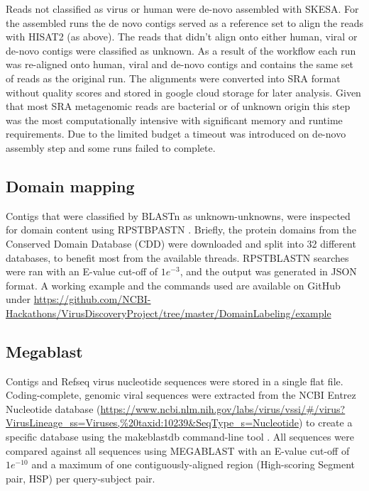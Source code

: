   Reads not classified as virus or human were de-novo assembled with SKESA. For
  the assembled runs the de novo contigs served as a reference set to align the
  reads with HISAT2 (as above). The reads that didn't align onto either human,
  viral or de-novo contigs were classified as unknown. As a result of the
  workflow each run was re-aligned onto human, viral and de-novo contigs and
  contains the same set of reads as the original run. The alignments were
  converted into SRA format without quality scores and stored in google cloud
  storage for later analysis. Given that most SRA metagenomic reads are
  bacterial or of unknown origin this step was the most computationally
  intensive with significant memory and runtime requirements. Due to the
  limited budget a timeout was introduced on de-novo assembly step and some
  runs failed to complete.

  \subsection{Domain mapping}
  Contigs that were classified by BLASTn as unknown-unknowns, were inspected
  for domain content using RPSTBPASTN \cite{Camacho2009}. Briefly, the protein
  domains from the Conserved Domain Database (CDD) \cite{Marchler-Bauer2017}  were
  downloaded and split into 32 different databases, to benefit most from the
  available threads. RPSTBLASTN searches were ran with an E-value cut-off of
  $1e^{-3}$, and the output was generated in JSON format. A working example and the
  commands used are available on GitHub under
  \url{https://github.com/NCBI-Hackathons/VirusDiscoveryProject/tree/master/DomainLabeling/example}

  \subsection{Megablast}
  Contigs and Refseq virus nucleotide sequences were stored in a single flat
  file. Coding-complete, genomic viral sequences were extracted from the NCBI
  Entrez Nucleotide database
  (\url{https://www.ncbi.nlm.nih.gov/labs/virus/vssi/#/virus?VirusLineage_ss=Viruses,%20taxid:10239&SeqType_s=Nucleotide})
  to create a specific database  using the makeblastdb command-line tool
  \cite{Camacho2009}. All sequences were compared against  all sequences using
  MEGABLAST \cite{Camacho2009} with an E-value cut-off of $1e^{-10}$ and a
  maximum of one contiguously-aligned region (High-scoring Segment pair, HSP)
  per query-subject pair.

